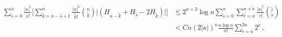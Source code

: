 \begin{equation}
\begin{split}
\sum_{\tilde s=0}^n 
\frac{|\kappa|^{\tilde s}}{\tilde s!} \biggl[
\sum_{\tilde k=n-\tilde s+1}^{n} 
\frac{ |\kappa|^{\tilde k}}{\tilde k!} \binom{n}{\tilde k}
\Big|(H_{n-\tilde k}+H_{\tilde s}-2 H_{\tilde k})\Big| \biggr]
&\leq 2^{n+2} \log n \sum_{\tilde s=0}^n 
\sum_{\tilde r=n }^{n+\tilde s}
\frac{|\kappa|^{\tilde r}}{\tilde r!}  
\binom{\tilde r}{\tilde s}\\
&< C n (2|\kappa|)^n  \frac{n\log n }{n!} \sum_{\tilde r=n }^{2n}  
2^{\tilde r}\,,
\end{split}
\end{equation}

